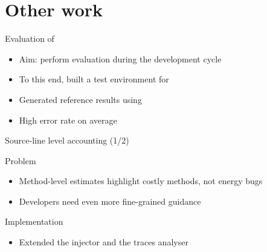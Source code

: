 \section{Other work}
%
%
\begin{frame}{Evaluation of \orka{}}
\begin{itemize}
\item Aim: perform evaluation during the development cycle
\item To this end, built a \alert{test environment} for \orka{}
\item Generated reference results using \petra{}
\item High error rate on average
\end{itemize}
\end{frame}
%
%
\begin{frame}{Source-line level accounting (1/2)}
\begin{block}{Problem}
\begin{itemize}
\item Method-level estimates highlight costly methods, not energy bugs
\item Developers need even more fine-grained guidance
\end{itemize}
\end{block}
\begin{block}{Implementation}
\begin{itemize}
\item Extended the injector and the traces analyser
\end{itemize}
\end{block}
\end{frame}
